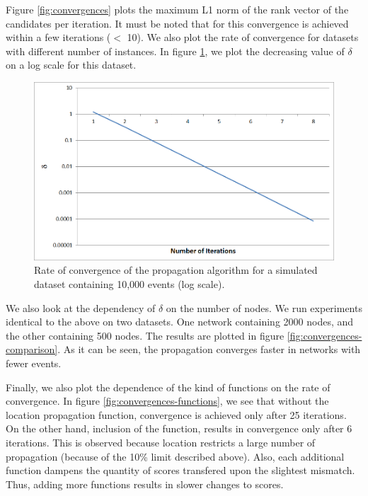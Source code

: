 Figure \ref{fig:convergences} plots the maximum L1 norm of the rank vector of the candidates per iteration. It must be noted that for this convergence is achieved within a few iterations ($<$ 10). We also plot the rate of convergence for datasets with different number of instances. In figure \ref{fig:convergences-log-scale}, we plot the decreasing value of $\delta$ on a log scale for this dataset.

\begin{figure}[h]
\centering
\includegraphics[width=\textwidth]{media/chapter6/conv/convergence-10K-log.png}
\caption{Rate of convergence of the propagation algorithm for a simulated dataset containing 10,000 events (log scale).}
\label{fig:convergences-log-scale}
\end{figure}

We also look at the dependency of $\delta$ on the number of nodes. We run experiments identical to the above on two datasets. One network containing 2000 nodes, and the other containing 500 nodes. The results are plotted in figure \ref{fig:convergences-comparison}. As it can be seen, the propagation converges faster in networks with fewer events.

Finally, we also plot the dependence of the kind of functions on the rate of convergence. In figure \ref{fig:convergences-functions}, we see that without the location propagation function, convergence is achieved only after 25 iterations. On the other hand, inclusion of the function, results in convergence only after 6 iterations. This is observed because location restricts a large number of propagation (because of the 10\% limit described above). Also, each additional function dampens the quantity of scores transfered upon the slightest mismatch. Thus, adding more functions results in slower changes to scores.

